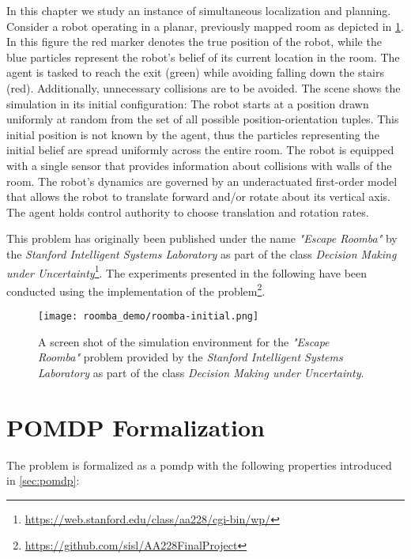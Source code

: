 In this chapter we study an instance of simultaneous localization and planning.
Consider a robot operating in a planar, previously mapped room as depicted in
\cref{fig:roomba-env}. In this figure the red marker denotes the true position
of the robot, while the blue particles represent the robot's belief of its
current location in the room. The agent is tasked to reach the exit (green)
while avoiding falling down the stairs (red). Additionally, unnecessary
collisions are to be avoided. The scene shows the simulation in its initial
configuration: The robot starts at a position drawn uniformly at random from
the set of all possible position-orientation tuples. This initial position is
not known by the agent, thus the particles representing the initial belief are
spread uniformly across the entire room. The robot is equipped with a single
sensor that provides information about collisions with walls of the room. The
robot's dynamics are governed by an underactuated first-order model that allows
the robot to translate forward and/or rotate about its vertical axis. The
agent holds control authority to choose translation and rotation rates.

This problem has originally been published under the name \emph{"Escape
Roomba"} by the \emph{Stanford Intelligent Systems Laboratory} as part of the
class \emph{Decision Making under
Uncertainty}\footnote{\url{https://web.stanford.edu/class/aa228/cgi-bin/wp/}}.
The experiments presented in the following have been conducted using the
\pomdpsjl implementation of the
problem\footnote{\url{https://github.com/sisl/AA228FinalProject}}.

\begin{figure}[htpb]
  \centering
  \texttt{[image: roomba\_demo/roomba-initial.png]}
  \caption{A screen shot of the simulation environment for the \emph{"Escape
  Roomba"} problem provided by the \emph{Stanford Intelligent Systems
  Laboratory} as part of the class \emph{Decision Making under Uncertainty}.}
  \label{fig:roomba-env}
\end{figure}

\clearpage
\section{POMDP Formalization}\label{sec:lp-pomdp-formalization}

The problem is formalized as a \ac{pomdp} with the following properties introduced in \cref{sec:pomdp}:

